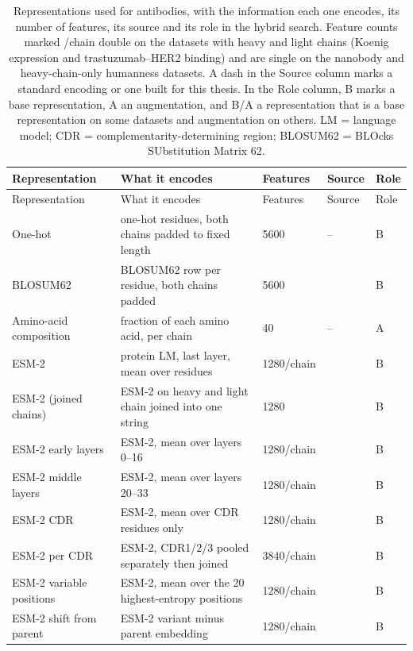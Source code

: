 \begin{longtable}{P{2.8cm}P{4.6cm}P{2.0cm}P{1.5cm}P{1.4cm}}
\caption[Representations used for antibodies.]{Representations used for antibodies, with the information each one encodes, its number of features, its source and its role in the hybrid search. Feature counts marked /chain double on the datasets with heavy and light chains (Koenig expression and trastuzumab--HER2 binding) and are single on the nanobody and heavy-chain-only humanness datasets. A dash in the Source column marks a standard encoding or one built for this thesis. In the Role column, B marks a base representation, A an augmentation, and B/A a representation that is a base representation on some datasets and augmentation on others. LM = language model; CDR = complementarity-determining region; BLOSUM62 = BLOcks SUbstitution Matrix 62.}\label{tab:reps_antibodies}\\
\toprule
Representation & What it encodes & Features & Source & Role \\
\midrule
\endfirsthead
\toprule
Representation & What it encodes & Features & Source & Role \\
\midrule
\endhead
\bottomrule
\endfoot
One-hot & one-hot residues, both chains padded to fixed length & 5600 & -- & B \\
BLOSUM62 & BLOSUM62 row per residue, both chains padded & 5600 & \citep{Henikoff1992} & B \\
Amino-acid composition & fraction of each amino acid, per chain & 40 & -- & A \\
ESM-2 & protein LM, last layer, mean over residues & 1280/chain & \citep{Lin2023} & B \\
ESM-2 (joined chains) & ESM-2 on heavy and light chain joined into one string & 1280 & \citep{Lin2023} & B \\
ESM-2 early layers & ESM-2, mean over layers 0--16 & 1280/chain & \citep{Lin2023} & B \\
ESM-2 middle layers & ESM-2, mean over layers 20--33 & 1280/chain & \citep{Lin2023} & B \\
ESM-2 CDR & ESM-2, mean over CDR residues only & 1280/chain & \citep{Lin2023} & B \\
ESM-2 per CDR & ESM-2, CDR1/2/3 pooled separately then joined & 3840/chain & \citep{Lin2023} & B \\
ESM-2 variable positions & ESM-2, mean over the 20 highest-entropy positions & 1280/chain & \citep{Lin2023} & B \\
ESM-2 shift from parent & ESM-2 variant minus parent embedding & 1280/chain & \citep{Lin2023} & B \\

\end{longtable}
